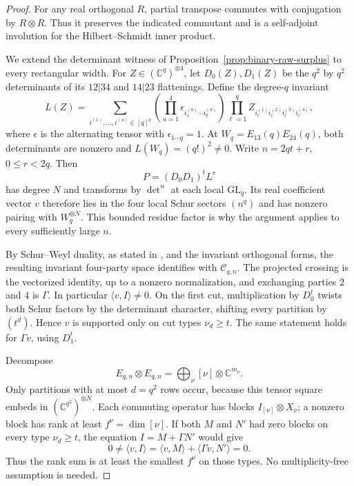 \begin{proof}
For any real orthogonal $R$, partial transpose commutes with
conjugation by $R\otimes R$. Thus it preserves the indicated
commutant and is a self-adjoint involution for the Hilbert--Schmidt
inner product.

We extend the determinant witness of
Proposition~\ref{prop:binary-raw-surplus} to every rectangular width.
For $Z\in(\mathbb C^q)^{\otimes4}$, let $D_0(Z),D_1(Z)$ be the
$q^2$ by $q^2$ determinants of its $12|34$ and $14|23$ flattenings.
Define the degree-$q$ invariant
\[
 L(Z)=\sum_{i^{(1)},\ldots,i^{(4)}\in[q]^q}
 \left(\prod_{a=1}^4
    \epsilon_{i^{(a)}_1\cdots i^{(a)}_q}\right)
 \prod_{\ell=1}^q
    Z_{i^{(1)}_\ell i^{(2)}_\ell i^{(3)}_\ell i^{(4)}_\ell},
\]
where $\epsilon$ is the alternating tensor with
$\epsilon_{1\cdots q}=1$. At
$W_q=E_{13}(q)E_{24}(q)$, both determinants are nonzero and
$L(W_q)=(q!)^2\ne0$.
Write $n=2qt+r$, $0\le r<2q$. Then
\[
 P=(D_0D_1)^tL^r
\]
has degree $N$ and transforms by $\det^n$ at each local
$\mathrm{GL}_q$. Its real coefficient vector $v$ therefore lies in
the four local Schur sectors $(n^q)$ and has nonzero pairing with
$W_q^{\otimes N}$. This bounded residue factor is why the argument
applies to every sufficiently large $n$.

By Schur--Weyl duality, as stated in
\cite[Section~2, p.~2]{Manivel2010}, and the invariant orthogonal forms, the
resulting invariant four-party space identifies with
$\mathcal C_{q,n}$. The projected crossing is the vectorized
identity, up to a nonzero normalization, and exchanging parties
$2$ and $4$ is $\Gamma$. In particular $\langle v,I\rangle\ne0$.
On the first cut, multiplication by $D_0^t$ twists both Schur
factors by the determinant character, shifting every partition by
$(t^d)$. Hence $v$ is supported only on cut types $\nu_d\ge t$.
The same statement holds for $\Gamma v$, using $D_1^t$.

Decompose
\[
 E_{q,n}\otimes E_{q,n}
   =\bigoplus_\nu [\nu]\otimes\mathbb C^{m_\nu}.
\]
Only partitions with at most $d=q^2$ rows occur, because this tensor
square embeds in $(\mathbb C^{q^2})^{\otimes N}$.
Each commuting operator has blocks $I_{[\nu]}\otimes X_\nu$;
a nonzero block has rank at least $f^\nu=\dim[\nu]$.
If both $M$ and $N'$ had zero blocks on every type $\nu_d\ge t$,
the equation $I=M+\Gamma N'$ would give
\[
 0\ne\langle v,I\rangle
   =\langle v,M\rangle+\langle\Gamma v,N'\rangle=0.
\]
Thus the rank sum is at least the smallest $f^\nu$ on those types.
No multiplicity-free assumption is needed.


\end{proof}
